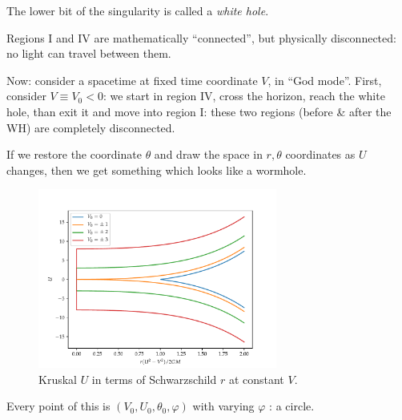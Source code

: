 \documentclass[main.tex]{subfiles}
\begin{document}
The lower bit of the singularity is called a \emph{white hole}. 

Regions I and IV are mathematically ``connected'', but physically disconnected: no light can travel between them. 

Now: consider a spacetime at fixed time coordinate \(V\), in ``God mode''. 
First, consider \(V \equiv V_0 < 0\): we start in region IV, cross the horizon, reach the white hole, than exit it and move into region I: these two regions (before \& after the WH) are completely disconnected.   


If we restore the coordinate \(\theta \) and draw the space in \(r, \theta \) coordinates as \(U\) changes, then we get something which looks like a wormhole. 

\begin{figure}[ht]
  \centering
  \includegraphics[width=0.7\textwidth]{figures/kruskal_constant_V.pdf}
  \caption{Kruskal \(U\) in terms of Schwarzschild \(r\) at constant \(V\).}
  \label{fig:kruskal-constant-V}
\end{figure}

Every point of this is \((V_0, U_0 , \theta_0 ,  \varphi  )\) with varying \(\varphi \) : a circle.  
\end{document}
